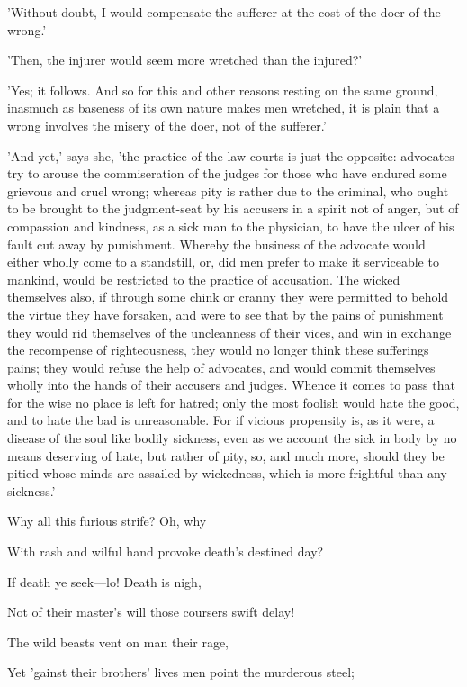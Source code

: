 'Without doubt, I would compensate the sufferer at the cost of the doer
of the wrong.'

'Then, the injurer would seem more wretched than the injured?'

'Yes; it follows. And so for this and other reasons resting on the same
ground, inasmuch as baseness of its own nature makes men wretched, it is
plain that a wrong involves the misery of the doer, not of the
sufferer.'

'And yet,' says she, 'the practice of the law-courts is just the
opposite: advocates try to arouse the commiseration of the judges for
those who have endured some grievous and cruel wrong; whereas pity is
rather due to the criminal, who ought to be brought to the judgment-seat
by his accusers in a spirit not of anger, but of compassion and
kindness, as a sick man to the physician, to have the ulcer of his fault
cut away by punishment. Whereby the business of the advocate would
either wholly come to a standstill, or, did men prefer to make it
serviceable to mankind, would be restricted to the practice of
accusation. The wicked themselves also, if through some chink or cranny
they were permitted to behold the virtue they have forsaken, and were to
see that by the pains of punishment they would rid themselves of the
uncleanness of their vices, and win in exchange the recompense of
righteousness, they would no longer think these sufferings pains; they
would refuse the help of advocates, and would commit themselves wholly
into the hands of their accusers and judges. Whence it comes to pass
that for the wise no place is left for hatred; only the most foolish
would hate the good, and to hate the bad is unreasonable. For if vicious
propensity is, as it were, a disease of the soul like bodily sickness,
even as we account the sick in body by no means deserving of hate, but
rather of pity, so, and much more, should they be pitied whose minds are
assailed by wickedness, which is more frightful than any sickness.'


Why all this furious strife? Oh, why

With rash and wilful hand provoke death's destined day?

If death ye seek—lo! Death is nigh,

Not of their master's will those coursers swift delay!

The wild beasts vent on man their rage,

Yet 'gainst their brothers' lives men point the murderous steel;

